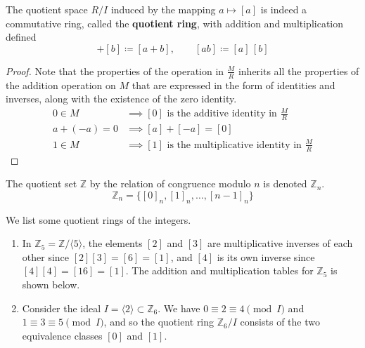     \begin{definition}
      The quotient space $R/I$ induced by the mapping $a \mapsto [a]$ is indeed a commutative ring, called the \textbf{quotient ring}, with addition and multiplication defined 
      \begin{equation}
        [a] + [b] \coloneqq [a + b], \qquad [ab] \coloneqq [a] \, [b]
      \end{equation}
    \end{definition}
    \begin{proof}
      Note that the properties of the operation in $\frac{M}{R}$ inherits all the properties of the addition operation on $M$ that are expressed in the form of identities and inverses, along with the existence of the zero identity. 
      \begin{align*}
        0 \in M & \implies [0] \text{ is the additive identity in } \frac{M}{R} \\
        a + (-a) = 0 & \implies [a] + [-a] = [0] \\
        1 \in M & \implies [1] \text{ is the multiplicative identity in } \frac{M}{R}
      \end{align*}
    \end{proof} 

    \begin{definition}
      The quotient set $\mathbb{Z}$ by the relation of congruence modulo $n$ is denoted $\mathbb{Z}_{n}$. 
      \begin{equation}
        \mathbb{Z}_{n} = \{ [0]_{n}, [1]_{n}, \ldots, [n-1]_{n} \}
      \end{equation}
    \end{definition}

    \begin{example}
      We list some quotient rings of the integers.  
      \begin{enumerate}
        \item In $\mathbb{Z}_{5} = \mathbb{Z}/\langle 5 \rangle$, the elements $[2]$ and $[3]$ are multiplicative inverses of each other since $[2] [3] = [6] = [1]$, and $[4]$ is its own inverse since $[4] [4] = [16] = [1]$. The addition and multiplication tables for $\mathbb{Z}_5$ is shown below. 
        \item Consider the ideal $I = \langle 2 \rangle \subset \mathbb{Z}_6$. We have $0 \equiv 2 \equiv 4 \pmod{I}$ and $1 \equiv 3 \equiv 5 \pmod{I}$, and so the quotient ring $\mathbb{Z}_6 / I$ consists of the two equivalence classes $[0]$ and $[1]$. 
      \end{enumerate}
    \end{example}

